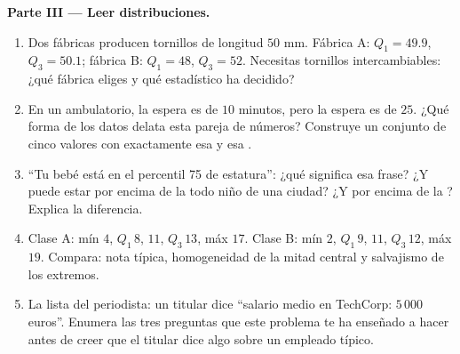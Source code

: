 \begin{problem}
\medskip
\noindent\textbf{Parte III --- Leer distribuciones.}
\begin{enumerate}[resume]
  \item Dos fábricas producen tornillos de longitud  $50$ mm. Fábrica
        A: $Q_1 = 49.9$, $Q_3 = 50.1$; fábrica B: $Q_1 = 48$, $Q_3 = 52$.
        Necesitas tornillos intercambiables: ¿qué fábrica eliges y qué
        estadístico ha decidido?
  \item En un ambulatorio, la espera  es de $10$ minutos, pero la
        espera  es de $25$. ¿Qué forma de los datos delata esta
        pareja de números? Construye un conjunto de cinco valores con
        exactamente esa  y esa .
  \item ``Tu bebé está en el percentil 75 de estatura'': ¿qué significa
        esa frase? ¿Y puede estar por encima de la  todo niño de una
        ciudad? ¿Y por encima de la ? Explica la diferencia.
  \item Clase A: mín $4$, $Q_1\,8$,  $11$, $Q_3\,13$, máx $17$.
        Clase B: mín $2$, $Q_1\,9$,  $11$, $Q_3\,12$, máx $19$.
        Compara: nota típica, homogeneidad de la mitad central y
        salvajismo de los extremos.
  \item La lista del periodista: un titular dice ``salario medio en
        TechCorp: $5\,000$ euros''. Enumera las tres preguntas que este
        problema te ha enseñado a hacer antes de creer que el titular dice
        algo sobre un empleado típico.
\end{enumerate}


\end{problem}
